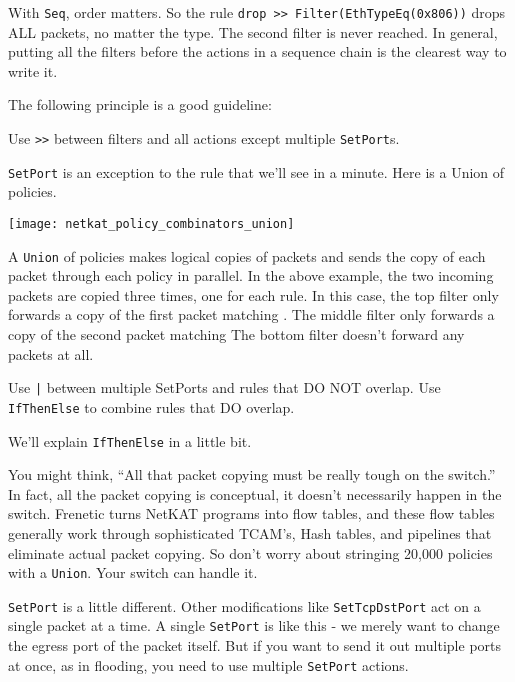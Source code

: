 With \texttt{Seq}, order matters.  So the rule \texttt{drop >> Filter(EthTypeEq(0x806))} 
drops ALL packets, no matter the type.  
The second filter is never reached.  
In general, putting all the filters before the actions in a sequence chain is the clearest way to write it.

The following principle is a good guideline:  

\begin{principle}
Use \texttt{>>} between filters and all actions except multiple \texttt{SetPort}s.
\end{principle}

\texttt{SetPort} is an exception to the rule that we'll see in a minute.  
Here is a Union of policies.

\texttt{[image: netkat\_policy\_combinators\_union]}

A \texttt{Union} of policies makes logical copies of packets and sends the copy of each packet
through each policy in parallel.  In the above example, the two incoming packets are copied three times, one
for each rule.  In this case, the top filter only forwards a copy of the first packet matching .
The middle filter only forwards a copy of the second packet  matching 
The bottom filter doesn't forward any packets at all.  

\begin{principle}
Use \texttt{|} between multiple SetPorts and rules that DO NOT overlap.
Use \texttt{IfThenElse} to combine rules that DO overlap. 
\end{principle}

We'll explain \texttt{IfThenElse} in a little bit.  

You might think, ``All that packet copying must be really tough on the switch.''  In fact, all the 
packet copying is conceptual, it doesn't necessarily happen in the switch.  Frenetic turns NetKAT
programs into flow tables, and these flow tables generally work through sophisticated TCAM's, Hash tables,
and pipelines that eliminate actual packet copying.  So don't worry about stringing 20,000 policies
with a \texttt{Union}.  Your switch can handle it.   

\texttt{SetPort} is a little different.  Other modifications like \texttt{SetTcpDstPort} act on a single packet at a time.
A single \texttt{SetPort} is like this - we merely want to change the egress port of the packet itself.  But if 
you want to send it out multiple ports at once, as in flooding, you need to use multiple \texttt{SetPort} actions.

